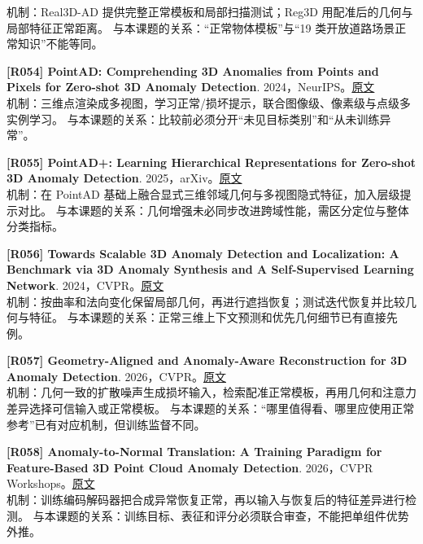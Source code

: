 \documentclass[11pt,a4paper]{article}
\begin{document}
机制：Real3D-AD 提供完整正常模板和局部扫描测试；Reg3D 用配准后的几何与局部特征正常距离。 与本课题的关系：“正常物体模板”与“19 类开放道路场景正常知识”不能等同。\par\medskip
\hypertarget{R054}{}\textbf{[R054] PointAD: Comprehending 3D Anomalies from Points and Pixels for Zero-shot 3D Anomaly Detection}. 2024，NeurIPS。\href{https://papers.nips.cc/paper_files/paper/2024/file/9a263e235f6d1521d13a8531c7974951-Paper-Conference.pdf}{原文}\\
机制：三维点渲染成多视图，学习正常/损坏提示，联合图像级、像素级与点级多实例学习。 与本课题的关系：比较前必须分开“未见目标类别”和“从未训练异常”。\par\medskip
\hypertarget{R055}{}\textbf{[R055] PointAD+: Learning Hierarchical Representations for Zero-shot 3D Anomaly Detection}. 2025，arXiv。\href{https://arxiv.org/pdf/2509.03277}{原文}\\
机制：在 PointAD 基础上融合显式三维邻域几何与多视图隐式特征，加入层级提示对比。 与本课题的关系：几何增强未必同步改进跨域性能，需区分定位与整体分类指标。\par\medskip
\hypertarget{R056}{}\textbf{[R056] Towards Scalable 3D Anomaly Detection and Localization: A Benchmark via 3D Anomaly Synthesis and A Self-Supervised Learning Network}. 2024，CVPR。\href{https://arxiv.org/pdf/2311.14897}{原文}\\
机制：按曲率和法向变化保留局部几何，再进行遮挡恢复；测试迭代恢复并比较几何与特征。 与本课题的关系：正常三维上下文预测和优先几何细节已有直接先例。\par\medskip
\hypertarget{R057}{}\textbf{[R057] Geometry-Aligned and Anomaly-Aware Reconstruction for 3D Anomaly Detection}. 2026，CVPR。\href{https://openaccess.thecvf.com/content/CVPR2026/papers/Wu_Geometry-Aligned_and_Anomaly-Aware_Reconstruction_for_3D_Anomaly_Detection_CVPR_2026_paper.pdf}{原文}\\
机制：几何一致的扩散噪声生成损坏输入，检索配准正常模板，再用几何和注意力差异选择可信输入或正常模板。 与本课题的关系：“哪里值得看、哪里应使用正常参考”已有对应机制，但训练监督不同。\par\medskip
\hypertarget{R058}{}\textbf{[R058] Anomaly-to-Normal Translation: A Training Paradigm for Feature-Based 3D Point Cloud Anomaly Detection}. 2026，CVPR Workshops。\href{https://openaccess.thecvf.com/content/CVPR2026W/VISION26/papers/Fichtel_Anomaly-to-Normal_Translation_A_Training_Paradigm_for_Feature-Based_3D_Point_Cloud_CVPRW_2026_paper.pdf}{原文}\\
机制：训练编码解码器把合成异常恢复正常，再以输入与恢复后的特征差异进行检测。 与本课题的关系：训练目标、表征和评分必须联合审查，不能把单组件优势外推。\par\medskip
\end{document}
